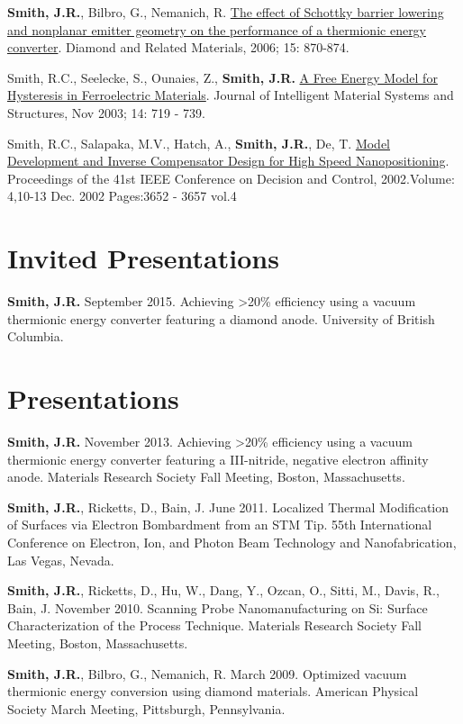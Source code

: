 \textbf{Smith, J.R.}, Bilbro, G., Nemanich, R.
\href{http://dx.doi.org/10.1016/j.diamond.2005.12.057}{The effect of
Schottky barrier lowering and nonplanar emitter geometry on the
performance of a thermionic energy converter}. Diamond and Related
Materials, 2006; 15: 870-874.

Smith, R.C., Seelecke, S., Ounaies, Z., \textbf{Smith, J.R.}
\href{http://dx.doi.org/10.1177/1045389X03038841}{A Free Energy Model
for Hysteresis in Ferroelectric Materials}. Journal of Intelligent
Material Systems and Structures, Nov 2003; 14: 719 - 739.

Smith, R.C., Salapaka, M.V., Hatch, A., \textbf{Smith, J.R.}, De, T.
\href{http://dx.doi.org/10.1109/CDC.2002.1184930}{Model Development and
Inverse Compensator Design for High Speed Nanopositioning}. Proceedings
of the 41st IEEE Conference on Decision and Control, 2002.Volume:
4,10-13 Dec. 2002 Pages:3652 - 3657 vol.4

\section{Invited Presentations}

\textbf{Smith, J.R.} September 2015. Achieving \textgreater{}20\%
efficiency using a vacuum thermionic energy converter featuring a
diamond anode. University of British Columbia.

\section{Presentations}

\textbf{Smith, J.R.} November 2013. Achieving \textgreater{}20\%
efficiency using a vacuum thermionic energy converter featuring a
III-nitride, negative electron affinity anode. Materials Research
Society Fall Meeting, Boston, Massachusetts.

\textbf{Smith, J.R.}, Ricketts, D., Bain, J. June 2011. Localized
Thermal Modification of Surfaces via Electron Bombardment from an STM
Tip. 55th International Conference on Electron, Ion, and Photon Beam
Technology and Nanofabrication, Las Vegas, Nevada.

\textbf{Smith, J.R.}, Ricketts, D., Hu, W., Dang, Y., Ozcan, O., Sitti,
M., Davis, R., Bain, J. November 2010. Scanning Probe Nanomanufacturing
on Si: Surface Characterization of the Process Technique. Materials
Research Society Fall Meeting, Boston, Massachusetts.

\textbf{Smith, J.R.}, Bilbro, G., Nemanich, R. March 2009. Optimized
vacuum thermionic energy conversion using diamond materials. American
Physical Society March Meeting, Pittsburgh, Pennsylvania.


